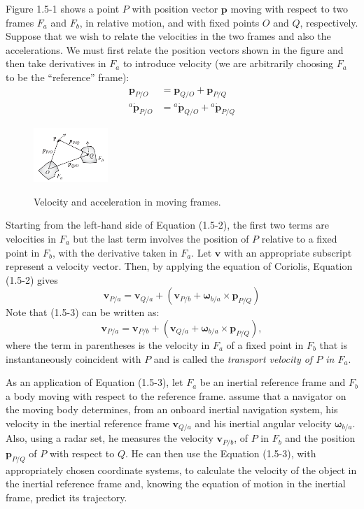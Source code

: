 Figure 1.5-1 shows a point \(P\) with position vector \(\mathbf{p}\) moving with respect to two frames \(F_{a}\) and \(F_{b}\), in relative motion, and with fixed points \(O\) and \(Q\), respectively. Suppose that we wish to relate the velocities in the two frames and also the accelerations. We must first relate the position vectors shown in the figure and then take derivatives in \(F_{a}\) to introduce velocity (we are arbitrarily choosing \(F_{a}\) to be the ``reference'' frame):
\begin{align}
    \mathbf{p}_{P/O} &= \mathbf{p}_{Q/O} + \mathbf{p}_{P/Q} \tag{1.5-1} \\
    {^{a}\dot{\mathbf{p}}_{P/O}} &= {^{a}\dot{\mathbf{p}}_{Q/O}} + {^{a}\dot{\mathbf{p}}_{P/Q}} \tag{1.5-2}
\end{align}
\begin{figure}[H]
    \centering
    \includegraphics[width=0.25\textwidth, keepaspectratio]{figuras/figure1.5-1.png}
    \label{fig1.5-1}
    \caption{Velocity and acceleration in moving frames.}
\end{figure}

Starting from the left-hand side of Equation (1.5-2), the first two terms are velocities in \(F_{a}\) but the last term involves the position of \(P\) relative to a fixed point in \(F_{b}\), with the derivative taken in \(F_{a}\). Let \(\mathbf{v}\) with an appropriate subscript represent a velocity vector. Then, by applying the equation of Coriolis, Equation (1.5-2) gives
\begin{equation}
    \mathbf{v}_{P/a} = \mathbf{v}_{Q/a} + \left( \mathbf{v}_{P/b} + \mathbf{\omega}_{b/a}\!\times\!\mathbf{p}_{P/Q} \right) \tag{1.5-3}
\end{equation}
Note that (1.5-3) can be written as:
\begin{equation*}
    \mathbf{v}_{P/a} = \mathbf{v}_{P/b} + \left( \mathbf{v}_{Q/a} + \mathbf{\omega}_{b/a}\!\times\!\mathbf{p}_{P/Q} \right),
\end{equation*}
where the term in parentheses is the velocity in \(F_{a}\) of a fixed point in \(F_{b}\) that is instantaneously coincident with \(P\) and is called the \textit{transport velocity of \(P\) in \(F_{a}\)}.

As an application of Equation (1.5-3), let \(F_{a}\) be an inertial reference frame and \(F_{b}\) a body moving with respect to the reference frame. assume that a navigator on the moving body determines, from an onboard inertial navigation system, his velocity in the inertial reference frame \(\mathbf{v}_{Q/a}\) and his inertial angular velocity \(\mathbf{\omega}_{b/a}\). Also, using a radar set, he measures the velocity \(\mathbf{v}_{P/b}\), of \(P\) in \(F_{b}\) and the position \(\mathbf{p}_{P/Q}\) of \(P\) with respect to \(Q\). He can then use the Equation (1.5-3), with appropriately chosen coordinate systems, to calculate the velocity of the object in the inertial reference frame and, knowing the equation of motion in the inertial frame, predict its trajectory.

